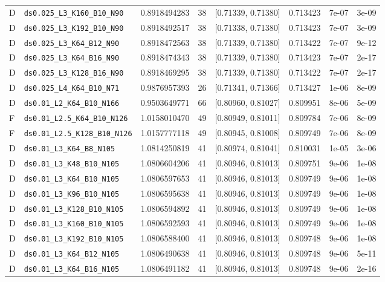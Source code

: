 \begin{longtable}{@{}llrllllr@{}}
D & \texttt{ds0.025\_L3\_K160\_B10\_N90} & 0.8918494283 & 38 & [0.71339, 0.71380] & 0.713423 & 7e-07 & 3e-09\\
D & \texttt{ds0.025\_L3\_K192\_B10\_N90} & 0.8918492517 & 38 & [0.71338, 0.71380] & 0.713423 & 7e-07 & 3e-09\\
D & \texttt{ds0.025\_L3\_K64\_B12\_N90} & 0.8918472563 & 38 & [0.71339, 0.71380] & 0.713422 & 7e-07 & 9e-12\\
D & \texttt{ds0.025\_L3\_K64\_B16\_N90} & 0.8918474343 & 38 & [0.71339, 0.71380] & 0.713423 & 7e-07 & 2e-17\\
D & \texttt{ds0.025\_L3\_K128\_B16\_N90} & 0.8918469295 & 38 & [0.71339, 0.71380] & 0.713422 & 7e-07 & 2e-17\\
D & \texttt{ds0.025\_L4\_K64\_B10\_N71} & 0.9876957393 & 26 & [0.71341, 0.71366] & 0.713427 & 1e-06 & 8e-09\\
D & \texttt{ds0.01\_L2\_K64\_B10\_N166} & 0.9503649771 & 66 & [0.80960, 0.81027] & 0.809951 & 8e-06 & 5e-09\\
F & \texttt{ds0.01\_L2.5\_K64\_B10\_N126} & 1.0158010470 & 49 & [0.80949, 0.81011] & 0.809784 & 7e-06 & 8e-09\\
F & \texttt{ds0.01\_L2.5\_K128\_B10\_N126} & 1.0157777118 & 49 & [0.80945, 0.81008] & 0.809749 & 7e-06 & 8e-09\\
D & \texttt{ds0.01\_L3\_K64\_B8\_N105} & 1.0814250819 & 41 & [0.80974, 0.81041] & 0.810031 & 1e-05 & 3e-06\\
D & \texttt{ds0.01\_L3\_K48\_B10\_N105} & 1.0806604206 & 41 & [0.80946, 0.81013] & 0.809751 & 9e-06 & 1e-08\\
D & \texttt{ds0.01\_L3\_K64\_B10\_N105} & 1.0806597653 & 41 & [0.80946, 0.81013] & 0.809749 & 9e-06 & 1e-08\\
D & \texttt{ds0.01\_L3\_K96\_B10\_N105} & 1.0806595638 & 41 & [0.80946, 0.81013] & 0.809749 & 9e-06 & 1e-08\\
D & \texttt{ds0.01\_L3\_K128\_B10\_N105} & 1.0806594892 & 41 & [0.80946, 0.81013] & 0.809749 & 9e-06 & 1e-08\\
D & \texttt{ds0.01\_L3\_K160\_B10\_N105} & 1.0806592593 & 41 & [0.80946, 0.81013] & 0.809749 & 9e-06 & 1e-08\\
D & \texttt{ds0.01\_L3\_K192\_B10\_N105} & 1.0806588400 & 41 & [0.80946, 0.81013] & 0.809748 & 9e-06 & 1e-08\\
D & \texttt{ds0.01\_L3\_K64\_B12\_N105} & 1.0806490638 & 41 & [0.80946, 0.81013] & 0.809748 & 9e-06 & 5e-11\\
D & \texttt{ds0.01\_L3\_K64\_B16\_N105} & 1.0806491182 & 41 & [0.80946, 0.81013] & 0.809748 & 9e-06 & 2e-16\\

\end{longtable}
